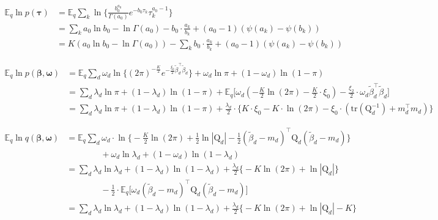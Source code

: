 \documentclass[twoside,11pt]{article}
\newcommand{\transpose}[1]{#1^{\intercal}}
\newcommand{\ksum}{\sum\limits_{k}}
\newcommand{\boldbeta}{\boldsymbol\beta}
\newcommand{\boldomega}{\boldsymbol\omega}
\newcommand{\boldtau}{\boldsymbol\tau}
\newcommand{\E}{\mathbb{E}}
\newcommand{\betad}{\tilde{\beta}_d}
\newcommand{\qmat}{\mathrm{Q}}
\newcommand{\trace}[1]{\mathrm{tr} \left( #1 \right)}
\begin{document}
\begin{align*}
	\E_q \ln p\left( \boldtau \right) &= \E_q \ksum \ln \Big\{ \frac{b_0^{a_0}}{\Gamma(a_0)} e^{-b_0 \tau_k} \tau_k^{a_0 - 1} \Big\} \\
	&= \ksum a_0 \ln b_0 - \ln \Gamma(a_0) - b_0 \cdot \frac{a_k}{b_k} + (a_0 - 1) \left( \psi(a_k) - \psi(b_k) \right) \\
	&= K \left( a_0 \ln b_0 - \ln \Gamma(a_0) \right) - \ksum b_0 \cdot \frac{a_k}{b_k} + (a_0 - 1) \left( \psi(a_k) - \psi(b_k) \right)
\end{align*}


\begin{align*}
	\E_q \ln p\left( \boldbeta, \boldomega \right) &= \E_q \sum_d \omega_d \ln \Big\{ (2\pi)^{-\frac{K}{2}} e^{-\frac{\xi_0}{2} \transpose{\betad} \betad}\Big\} + \omega_d \ln \pi + (1 - \omega_d) \ln \left( 1 - \pi \right) \\
	&= \sum_d \lambda_d \ln \pi + (1 - \lambda_d) \ln (1 - \pi) + \E_q \Big[ \omega_d \left( - \frac{K}{2} \ln (2\pi) - \frac{K}{2} \cdot \xi_0 \right) - \frac{\xi_2}{2} \cdot \omega_d \transpose{\betad} \betad\Big] \\
	&= \sum_d \lambda_d \ln \pi + (1 - \lambda_d) \ln (1 - \pi) + \frac{\lambda_d}{2} \cdot \Big\{ K \cdot \xi_0 - K \cdot \ln (2 \pi) - \xi_0 \cdot \left( \trace{\qmat_d^{-1}} + \transpose{m_d}m_d \right) \Big\}
\end{align*}


\begin{align*}
	\E_q \ln q\left( \boldbeta, \boldomega \right) &=  \E_q \sum_d \omega_d \cdot \ln \Big\{ -\frac{K}{2} \ln (2\pi) + \frac{1}{2} \ln |\qmat_d | - \frac{1}{2} \transpose{\left( \betad - m_d \right)} \qmat_d \left( \betad - m_d \right) \Big\} \\
	& \qquad \qquad  + \omega_d \ln \lambda_d + (1 - \omega_d) \ln (1 - \lambda_d) \\
	&= \sum_d \lambda_d \ln \lambda_d + (1 - \lambda_d) \ln (1-\lambda_d) + \frac{\lambda_d}{2} \Big\{ - K \ln (2\pi) + \ln |\qmat_d|\Big\} \\
	& \qquad \qquad  - \frac{1}{2} \cdot \E_q \Big[ \omega_d \transpose{\left( \betad - m_d \right)} \qmat_d \left( \betad - m_d \right) \Big] \\
	&= \sum_d \lambda_d \ln \lambda_d + (1 - \lambda_d) \ln (1-\lambda_d) + \frac{\lambda_d}{2} \Big\{ - K \ln (2\pi) + \ln |\qmat_d| - K\Big\}
\end{align*}
\end{document}
